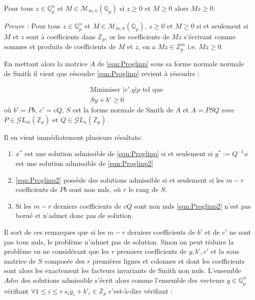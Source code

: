 \begin{lemme}
	Pour tous $z \in \mathbb{Q}_{ p } ^n$ et $M \in \mathcal{M}_{m,n}\left( \mathbb{Q}_{ p }  \right)  $ si $z\ge 0$ et $M\ge 0$ alors $Mz\ge 0$.  
\end{lemme}
\textit{Preuve :} Pour tous $z \in \mathbb{Q}_{ p } ^n$ et $M \in \mathcal{M}_{m,n}\left( \mathbb{Q}_{ p }  \right)  $,  $z\ge 0$ et $M\ge 0$ si et seulement si  $M$ et $z$ sont à coefficients dans $\mathbb{Z}_p$, or les coefficients de $Mz$ s'écrivant comme sommes et produits de coefficients de $M$ et $z$, on a $Mz \in \mathbb{Z}_p^m$ i.e. $Mz\ge 0$.       
\hfill\qedsymbol



En mettant alors la matrice $A$ de \ref{eqn:Proglinp} sous sa forme normale normale de Smith il vient que résoudre \ref{eqn:Proglinp} revient à résoudre :    


\begin{equation}
	  \tag{PLp'}
\begin{matrix}
	\text{Minimiser } |c'.y|p \text{ tel que }\\
	Sy + b' \ge 0
 \end{matrix}
	    \label{eqn:Proglinp2}
\end{equation}
où $b' = Pb$, $c' = cQ$, $S$ est la forme normale de Smith de $A$ et $A = P S Q$ avec $P \in \mathcal{G}L_m\left( \mathbb{Z}_p \right)$ et $ Q \in \mathcal{G}L_n\left( \mathbb{Z}_p \right)$.

Il en vient immédiatement plusieurs résultats:
\begin{enumerate}
	\item $x^*$ est une solution admissible de \ref{eqn:Proglinp} si et seulement si $y^* := Q^{-1} x$ est une solution admissible de \ref{eqn:Proglinp2}
	\item \ref{eqn:Proglinp2} possède des solutions admissible si et seulement si les $m-r$ coefficients de $Pb$ sont non nuls, où $r$ le rang de $S$.     
	\item Si les $m-r$ derniers coefficients de $cQ$ sont non nuls \ref{eqn:Proglinp2} n'est pas borné et n'admet donc pas de solution.   
\end{enumerate}

Il sort de ces remarques que si les $m-r$ derniers coefficients de $b'$ et de $c'$ ne sont pas tous nuls, le problème n'admet pas de solution. Sinon on peut réduire la problème en ne considérant que les $r$ premiers coefficients de $y, b', c'$ et la sous matrice de $S$ composée des $r$ premières lignes et colonnes et dont les coefficients sont alors les exactement les facteurs invariants de Smith non nuls. L'ensemble $Adm$ des solutions admissible s'écrit alors comme l'ensemble des vecteurs $y \in \mathbb{Q}_{ p } ^n$ vérifiant $
\forall 1 \le i\le r \ s_i y_i + b'_i \in \mathbb{Z}_p$ c'est-à-dire vérifiant :


